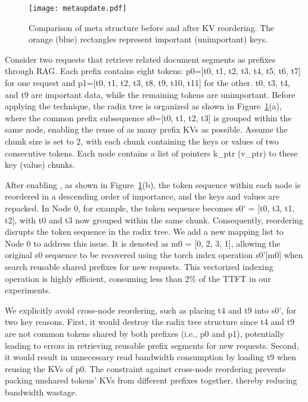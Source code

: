 \begin{figure}
	\centering
	\texttt{[image: metaupdate.pdf]}
	\caption{Comparison of meta structure before and after KV reordering. The orange (blue) rectangles represent important (unimportant) keys.}
	\label{fig:metaupdate}
	\vspace{-0.1in}
\end{figure}

Consider two requests that retrieve related document segments as prefixes
through RAG. Each prefix contains eight tokens: p0=[t0, t1, t2, t3, t4, t5, t6,
t7] for one request and p1=[t0, t1, t2, t3, t8, t9, t10, t11] for the other. t0,
t3, t4, and t9 are important data, while the remaining tokens are unimportant.
Before applying the \techba{} technique, the radix tree is organized as shown in
Figure~\ref{fig:metaupdate}(a), where the common prefix subsequence s0=[t0, t1,
t2, t3] is grouped within the same node, enabling the reuse of as many prefix
KVs as possible. Assume the chunk size is set to 2, with each chunk containing the keys or values of two consecutive tokens.
 Each node contains a list of pointers k\_ptr (v\_ptr) to
these key (value) chunks.

After enabling \techba{}, as shown in Figure~\ref{fig:metaupdate}(b), the token sequence within each node is reordered in a descending order of importance, and the keys and values are repacked. In Node 0, for example, the token sequence becomes s0' = [t0, t3, t1, t2], with t0 and t3 now grouped within the same chunk. 
Consequently, reordering disrupts the token sequence in the radix tree.
We add a new mapping list to Node 0 to address this issue.
It is denoted as m0 = [0, 2, 3, 1], allowing the original s0 sequence to be recovered using the torch index operation s0'[m0] when search reusable shared prefixes for new requests. This vectorized indexing operation is highly efficient, consuming less than 2\% of the TTFT in our experiments. 

We explicitly avoid cross-node reordering, such as placing t4 and t9 into s0', for two key reasons. First, it would destroy the radix tree structure since t4 and t9 are not common tokens shared by both prefixes (i.e., p0 and p1), potentially leading to errors in retrieving reusable prefix segments for new requests. Second, it would result in unnecessary read bandwidth consumption by loading t9 when reusing the KVs of p0. The constraint against cross-node reordering prevents packing unshared tokens' KVs from different prefixes together, thereby reducing bandwidth wastage.


